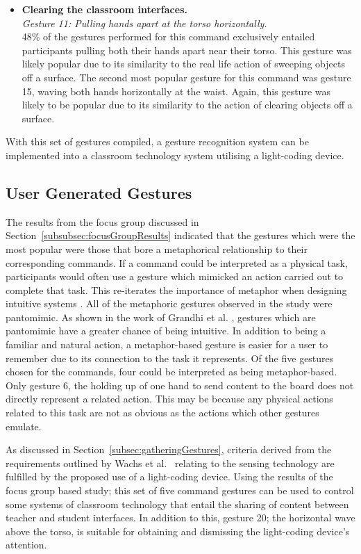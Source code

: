 \documentclass[link]{IWCOMP}
\begin{document}
\begin{itemize}
\item \textbf{Clearing the classroom interfaces.}\\
\textit{Gesture 11: Pulling hands apart at the torso horizontally.}\\
48\% of the gestures performed for this command exclusively entailed participants pulling both their hands apart near their torso.
This gesture was likely popular due to its similarity to the real life action of sweeping objects off a surface.
The second most popular gesture for this command was gesture 15, waving both hands horizontally at the waist.
Again, this gesture was likely to be popular due to its similarity to the action of clearing objects off a surface.\\
\end{itemize}

With this set of gestures compiled, a gesture recognition system can be implemented into a classroom technology system utilising a light-coding device.

\subsection{User Generated Gestures}
\label{subsec:userGeneratedGestures}

The results from the focus group discussed in Section~\ref{subsubsec:focusGroupResults} indicated that the gestures which were the most popular were those that bore a metaphorical relationship to their corresponding commands.
If a command could be interpreted as a physical task, participants would often use a gesture which mimicked an action carried out to complete that task.
This re-iterates the importance of metaphor when designing intuitive systems \cite{Wang2008}.
All of the metaphoric gestures observed in the study were pantomimic.
As shown in the work of Grandhi et al. \citeyearpar{Grandhi2011}, gestures which are pantomimic have a greater chance of being intuitive.
In addition to being a familiar and natural action, a metaphor-based gesture is easier for a user to remember due to its connection to the task it represents.
Of the five gestures chosen for the commands, four could be interpreted as being metaphor-based.
Only gesture 6, the holding up of one hand to send content to the board does not directly represent a related action.
This may be because any physical actions related to this task are not as obvious as the actions which other gestures emulate.

As discussed in Section~\ref{subsec:gatheringGestures}, criteria derived from the requirements outlined by Wachs et al.~\citeyearpar{Wachs2011} relating to the sensing technology are fulfilled by the proposed use of a light-coding device.
Using the results of the focus group based study; this set of five command gestures can be used to control some systems of classroom technology that entail the sharing of content between teacher and student interfaces.
In addition to this, gesture 20; the horizontal wave above the torso, is suitable for obtaining and dismissing the light-coding device's attention.
\end{document}
